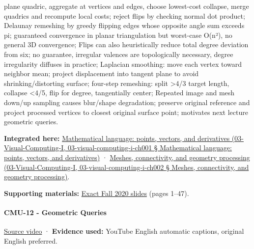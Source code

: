plane quadric, aggregate at vertices and edges, choose lowest-cost collapse, merge quadrics and recompute local costs; reject flips by checking normal dot product; Delaunay remeshing by greedy flipping edges whose opposite angle sum exceeds pi; guaranteed convergence in planar triangulation but worst-case O(n²), no general 3D convergence; Flips can also heuristically reduce total degree deviation from six; no guarantee, irregular valences are topologically necessary, degree irregularity diffuses in practice; Laplacian smoothing: move each vertex toward neighbor mean; project displacement into tangent plane to avoid shrinking/distorting surface; four-step remeshing: split \textgreater4/3 target length, collapse \textless4/5, flip for degree, tangentially center; Repeated image and mesh down/up sampling causes blur/shape degradation; preserve original reference and project processed vertices to closest original surface point; motivates next lecture geometric queries.

\textbf{Integrated here:} \href{}{Mathematical language: points, vectors, and derivatives (03-Visual-Computing-I, 03-visual-computing-i-ch001 § Mathematical language: points, vectors, and derivatives)} · \href{}{Meshes, connectivity, and geometry processing (03-Visual-Computing-I, 03-visual-computing-i-ch002 § Meshes, connectivity, and geometry processing)}.

\textbf{Supporting materials:} \href{https://15462.courses.cs.cmu.edu/fall2020content/lectures/11_geometryprocessing/11_geometryprocessing_slides.pdf}{Exact Fall 2020 slides} (pages 1--47).

\paragraph{CMU-12 - Geometric Queries}\label{cmu-12---geometric-queries}

\href{https://www.youtube.com/watch?v=GPPyUT9Pytw}{Source video} · \textbf{Evidence used:} YouTube English automatic captions, original English preferred.

